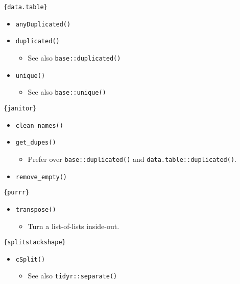 \documentclass[
]{book}
\providecommand{\tightlist}{%
  \setlength{\itemsep}{0pt}\setlength{\parskip}{0pt}}
\begin{document}
\texttt{\{data.table\}}

\begin{itemize}
\tightlist
\item
  \texttt{anyDuplicated()}
\item
  \texttt{duplicated()}

  \begin{itemize}
  \tightlist
  \item
    See also \texttt{base::duplicated()}
  \end{itemize}
\item
  \texttt{unique()}

  \begin{itemize}
  \tightlist
  \item
    See also \texttt{base::unique()}
  \end{itemize}
\end{itemize}

\texttt{\{janitor\}}

\begin{itemize}
\tightlist
\item
  \texttt{clean\_names()}
\item
  \texttt{get\_dupes()}

  \begin{itemize}
  \tightlist
  \item
    Prefer over \texttt{base::duplicated()} and \texttt{data.table::duplicated()}.
  \end{itemize}
\item
  \texttt{remove\_empty()}
\end{itemize}

\texttt{\{purrr\}}

\begin{itemize}
\tightlist
\item
  \texttt{transpose()}

  \begin{itemize}
  \tightlist
  \item
    Turn a list-of-lists inside-out.
  \end{itemize}
\end{itemize}

\texttt{\{splitstackshape\}}

\begin{itemize}
\tightlist
\item
  \texttt{cSplit()}

  \begin{itemize}
  \tightlist
  \item
    See also \texttt{tidyr::separate()}
  \end{itemize}
\end{itemize}
\end{document}
